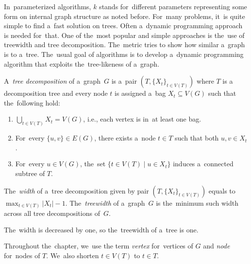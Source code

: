 In~parameterized algorithms, \( k \) stands for~different parameters
representing some form on internal graph structure as noted before.
%
For~many problems, it~is quite simple to find a~fast solution on trees.
Often a~dynamic programming approach is needed for~that.
%
One of the~most popular and simple approaches
is the~use of treewidth and tree decomposition.
The~metric tries to show how similar a~graph is to a~tree.
%
The~usual goal of algorithms is to develop a~dynamic programming algorithm
that exploits the~tree-likeness of a~graph.

%
\begin{definition}
	A~\emph{tree decomposition} of a~graph~\( G \) is
	a~pair \( (T, {\{X_t\}}_{t \in V ( T )}) \)
	where \( T \) is a decomposition tree and every node \( t \)
	is assigned a~bag \( X_t \subseteq V(G) \) such that the~following hold:
	\begin{enumerate}
		\item \( \bigcup_{t \in V(T)} X_t = V(G) \),
		      i.e., each vertex is in~at least one bag.
		\item For~every \( \{u,v\} \in E(G) \), there exists
		      a~node \( t \in T \) such that both \( u, v \in X_t \).
		\item For~every \( u \in V(G) \),
		      the~set \( \{t \in V(T) \mid u \in X_t\} \)
		      induces a~connected subtree of \( T \).
	\end{enumerate}
\end{definition}
%
\begin{definition}
	The~\emph{width} of a~tree decomposition given by pair
	\( (T, {\{X_t\}}_{t \in V ( T )}) \)
	equals to \( \max_{t\in V(T)} |X_t| - 1 \).
	The~\emph{treewidth} of a~graph~\( G \) is the~minimum such width
	across all tree decompositions of~\( G \).
\end{definition}
%
The~width is decreased by one, so the~treewidth of a~tree is one.

Throughout the~chapter, we~use the term \emph{vertex} for~vertices of \( G \)
and \emph{node} for~nodes of \( T \).
We~also shorten \( t \in V(T) \) to \( t \in T \).

